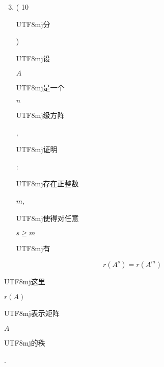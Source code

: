 \documentclass[10pt]{article}
\begin{document}
\begin{enumerate}
  \setcounter{enumi}{2}
  \item ( 10 \begin{CJK}{UTF8}{mj}分\end{CJK}) \begin{CJK}{UTF8}{mj}设\end{CJK} $A$ \begin{CJK}{UTF8}{mj}是一个\end{CJK} $n$ \begin{CJK}{UTF8}{mj}级方阵\end{CJK}, \begin{CJK}{UTF8}{mj}证明\end{CJK}: \begin{CJK}{UTF8}{mj}存在正整数\end{CJK} $m$, \begin{CJK}{UTF8}{mj}使得对任意\end{CJK} $s \geqslant m$ \begin{CJK}{UTF8}{mj}有\end{CJK}
\end{enumerate}
$$
r\left(A^{s}\right)=r\left(A^{m}\right)
$$
\begin{CJK}{UTF8}{mj}这里\end{CJK} $r(A)$ \begin{CJK}{UTF8}{mj}表示矩阵\end{CJK} $A$ \begin{CJK}{UTF8}{mj}的秩\end{CJK}.
\end{document}
